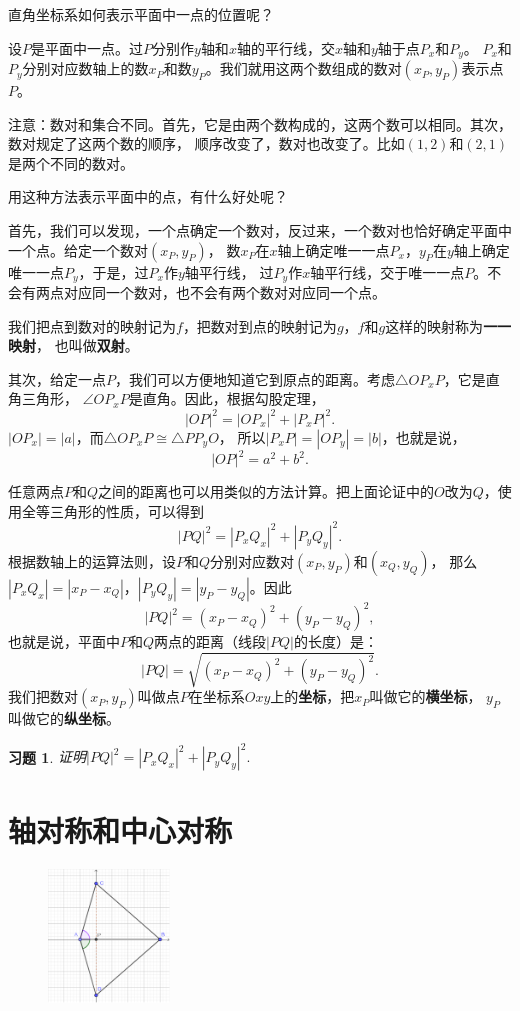 \documentclass[12pt,UTF8]{ctexbook}
\newtheorem{xt}{习题}[section]
\begin{document}
直角坐标系如何表示平面中一点的位置呢？

设$P$是平面中一点。过$P$分别作$y$轴和$x$轴的平行线，交$x$轴和$y$轴于点$P_x$和$P_y$。
$P_x$和$P_y$分别对应数轴上的数$x_P$和数$y_P$。我们就用这两个数组成的数对$(x_P, y_P)$表示点$P$。

注意：数对和集合不同。首先，它是由两个数构成的，这两个数可以相同。其次，数对规定了这两个数的顺序，
顺序改变了，数对也改变了。比如$(1,2)$和$(2,1)$是两个不同的数对。

用这种方法表示平面中的点，有什么好处呢？

首先，我们可以发现，一个点确定一个数对，反过来，一个数对也恰好确定平面中一个点。给定一个数对$(x_P, y_P)$，
数$x_P$在$x$轴上确定唯一一点$P_x$，$y_P$在$y$轴上确定唯一一点$P_y$，于是，过$P_x$作$y$轴平行线，
过$P_y$作$x$轴平行线，交于唯一一点$P$。不会有两点对应同一个数对，也不会有两个数对对应同一个点。

我们把点到数对的映射记为$f$，把数对到点的映射记为$g$，$f$和$g$这样的映射称为\textbf{一一映射}，
也叫做\textbf{双射}。

其次，给定一点$P$，我们可以方便地知道它到原点的距离。考虑$\triangle OP_xP$，它是直角三角形，
$\angle OP_xP$是直角。因此，根据勾股定理，
$$|OP|^2 = |OP_x|^2 + |P_xP|^2.$$
$|OP_x| = |a|$，而$\triangle OP_xP\cong \triangle PP_yO$，
所以$|P_xP| = |OP_y| = |b|$，也就是说，
$$ |OP|^2 = a^2 + b^2.$$

任意两点$P$和$Q$之间的距离也可以用类似的方法计算。把上面论证中的$O$改为$Q$，使用全等三角形的性质，可以得到
$$|PQ|^2 = |P_xQ_x|^2 + |P_yQ_y|^2.$$
根据数轴上的运算法则，设$P$和$Q$分别对应数对$(x_P, y_P)$和$(x_Q, y_Q)$，
那么$|P_xQ_x| = |x_P- x_Q|$，$|P_yQ_y| = |y_P- y_Q|$。因此
$$ |PQ|^2 = (x_P- x_Q)^2 + (y_P - y_Q)^2,$$
也就是说，平面中$P$和$Q$两点的距离（线段$|PQ|$的长度）是：
$$ |PQ| = \sqrt{(x_P- x_Q)^2 + (y_P - y_Q)^2}.$$
我们把数对$(x_P, y_P)$叫做点$P$在坐标系$Oxy$上的\textbf{坐标}，把$x_P$叫做它的\textbf{横坐标}，
$y_P$叫做它的\textbf{纵坐标}。
\begin{xt}\label{ex:4-0-0}
    证明$|PQ|^2 = |P_xQ_x|^2 + |P_yQ_y|^2.$
\end{xt}

\section{轴对称和中心对称}
\begin{figure} %
    \vspace{-30pt}
    \centering
    \includegraphics[width=0.288\textwidth]{坐标系3.png}
\end{figure}
\end{document}
